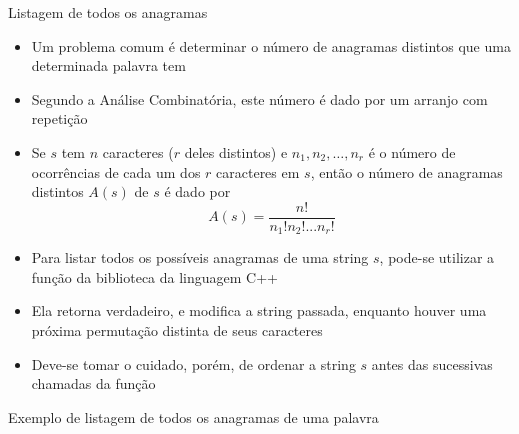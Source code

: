 \begin{frame}[fragile]{Listagem de todos os anagramas}

    \begin{itemize}
        \item Um problema comum é determinar o número de anagramas distintos que uma determinada 
            palavra tem
        \pause

        \item Segundo a Análise Combinatória, este número é dado por um arranjo com repetição
        \pause

        \item Se $s$ tem $n$ caracteres ($r$ deles distintos) e $n_1, n_2, \ldots, n_r$ é o número 
            de ocorrências de cada um dos $r$ caracteres em $s$, então o número de anagramas 
            distintos $A(s)$ de $s$ é dado por
            \[
                A(s) = \frac{n!}{n_1!n_2!...n_r!}
            \]
        \pause

        \item Para listar todos os possíveis anagramas de uma string $s$, pode-se utilizar a 
            função  da biblioteca  da linguagem C++
        \pause

        \item Ela retorna verdadeiro, e modifica a string passada, enquanto houver uma próxima 
            permutação distinta de seus caracteres
        \pause

        \item Deve-se tomar o cuidado, porém, de ordenar a string $s$ antes das sucessivas 
            chamadas da função 
    \end{itemize}

\end{frame}

\begin{frame}[fragile]{Exemplo de listagem de todos os anagramas de uma palavra}
\end{frame}
